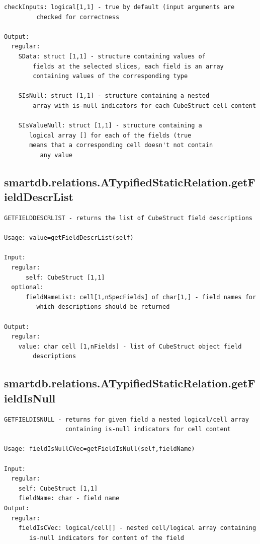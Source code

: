 \documentclass[letterpaper,10pt,english]{sphinxmanual}
\begin{document}
\begin{Verbatim}[commandchars=\\\{\}]
      checkInputs: logical[1,1] - true by default (input arguments are
         checked for correctness

Output:
  regular:
    SData: struct [1,1] - structure containing values of
        fields at the selected slices, each field is an array
        containing values of the corresponding type

    SIsNull: struct [1,1] - structure containing a nested
        array with is-null indicators for each CubeStruct cell content

    SIsValueNull: struct [1,1] - structure containing a
       logical array [] for each of the fields (true
       means that a corresponding cell doesn't not contain
          any value
\end{Verbatim}


\subsection{smartdb.relations.ATypifiedStaticRelation.getFieldDescrList}
\label{chap_functions:smartdb-relations-atypifiedstaticrelation-getfielddescrlist}
\begin{Verbatim}[commandchars=\\\{\}]
GETFIELDDESCRLIST - returns the list of CubeStruct field descriptions

Usage: value=getFieldDescrList(self)

Input:
  regular:
      self: CubeStruct [1,1]
  optional:
      fieldNameList: cell[1,nSpecFields] of char[1,] - field names for
         which descriptions should be returned

Output:
  regular:
    value: char cell [1,nFields] - list of CubeStruct object field
        descriptions
\end{Verbatim}


\subsection{smartdb.relations.ATypifiedStaticRelation.getFieldIsNull}
\label{chap_functions:smartdb-relations-atypifiedstaticrelation-getfieldisnull}
\begin{Verbatim}[commandchars=\\\{\}]
GETFIELDISNULL - returns for given field a nested logical/cell array
                 containing is-null indicators for cell content

Usage: fieldIsNullCVec=getFieldIsNull(self,fieldName)

Input:
  regular:
    self: CubeStruct [1,1]
    fieldName: char - field name
Output:
  regular:
    fieldIsCVec: logical/cell[] - nested cell/logical array containing
       is-null indicators for content of the field
\end{Verbatim}
\end{document}
